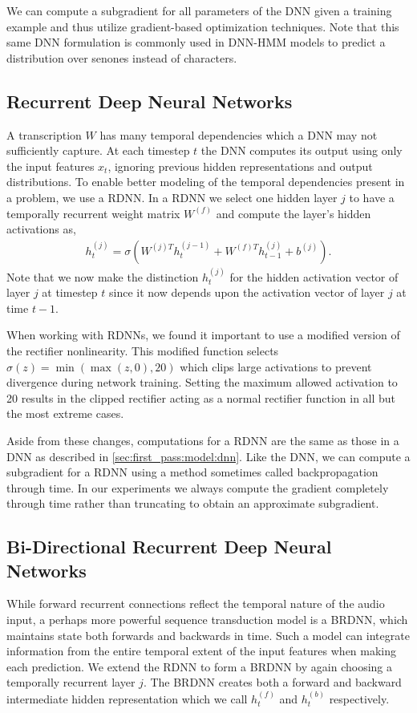 We can compute a subgradient for all parameters of the DNN given a training
example and thus utilize gradient-based optimization techniques. Note that this
same DNN formulation is commonly used in DNN-HMM models to predict a
distribution over senones instead of characters.

\subsection{Recurrent Deep Neural Networks}

A transcription $W$ has many temporal dependencies which a DNN may not
sufficiently capture. At each timestep $t$ the DNN computes its output using
only the input features $x_t$, ignoring previous hidden representations and
output distributions. To enable better modeling of the temporal dependencies
present in a problem, we use a RDNN. In a RDNN we select one hidden layer $j$
to have a temporally recurrent weight matrix $W^{(f)}$ and compute the layer's
hidden activations as,
\begin{align*}
  h^{(j)}_t = \sigma(W^{(j)T} h^{(j-1)}_t +  W^{(f)T} h^{(j)}_{t-1} + b^{(j)}).
\end{align*}
Note that we now make the distinction $h^{(j)}_t$ for the hidden activation
vector of layer $j$ at timestep $t$ since it now depends upon the activation
vector of layer $j$ at time $t-1$.

When working with RDNNs, we found it important to use a modified version of the
rectifier nonlinearity. This modified function selects $\sigma(z) = \min( \max
(z, 0), 20)$ which clips large activations to prevent divergence during network
training. Setting the maximum allowed activation to 20 results in the clipped
rectifier acting as a normal rectifier function in all but the most extreme
cases.

Aside from these changes, computations for a RDNN are the same as those in a
DNN as described in \ref{sec:first_pass:model:dnn}. Like the DNN, we can
compute a subgradient for a RDNN using a method sometimes called
backpropagation through time. In our experiments we always compute the gradient
completely through time rather than truncating to obtain an approximate
subgradient.

\subsection{Bi-Directional Recurrent Deep Neural Networks}

While forward recurrent connections reflect the temporal nature of the audio
input, a perhaps more powerful sequence transduction model is a BRDNN, which
maintains state both forwards and backwards in time. Such a model can integrate
information from the entire temporal extent of the input features when making
each prediction. We extend the RDNN to form a BRDNN by again choosing a
temporally recurrent layer $j$. The BRDNN creates both a forward and backward
intermediate hidden representation which we call $h_t^{(f)}$ and $h_t^{(b)}$
respectively. 

